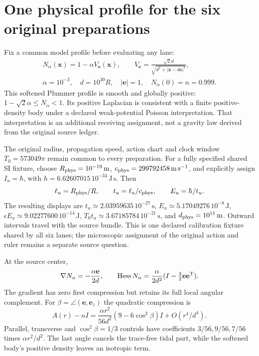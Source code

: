 \section{One physical profile for the six original preparations}
Fix a common model profile before evaluating any lane:
\[
 \begin{gathered}
 N_\alpha(\mathbf x)=1-\alpha V_{\mathbf e}(\mathbf x),\qquad
 V_{\mathbf e}=\frac{\sqrt2d}{\sqrt{d^2+|\mathbf x-d\mathbf e|^2}},\\
 \alpha=10^{-3},\quad d=10^{30}R,\quad |\mathbf e|=1,
 \quad N_\alpha(0)=n=0.999.
 \end{gathered}
\]
This softened Plummer profile is smooth and globally positive:
$1-\sqrt2\alpha\le N_\alpha<1$. Its positive Laplacian is consistent with
a finite positive-density body under a declared weak-potential Poisson
interpretation. That interpretation is an additional receiving assignment,
not a gravity law derived from the original source ledger.

The original radius, propagation speed, action chart and clock window
$T_0=573049\pi$ remain common to every preparation. For a fully specified
shared SI fixture, choose $R_{\rm phys}=10^{-19}\,\mathrm m$,
$c_{\rm phys}=299792458\,\mathrm{m\,s^{-1}}$, and explicitly assign
$I_u=\hbar$, with $h=6.62607015\,10^{-34}\,\mathrm{J\,s}$. Then
\[
 \ell_u=R_{\rm phys}/R,\qquad t_u=\ell_u/c_{\rm phys},
 \qquad E_u=\hbar/t_u.
\]
The resulting displays are $t_u\simeq2.03959635\,10^{-27}\,\mathrm s$,
$E_u\simeq5.17049276\,10^{-8}\,\mathrm J$,
$\epsilon E_u\simeq9.02277600\,10^{-14}\,\mathrm J$,
$T_0t_u\simeq3.67185784\,10^{-21}\,\mathrm s$, and
$d_{\rm phys}=10^{11}\,\mathrm m$. Outward intervals travel with the
source bundle. This is one declared calibration fixture shared by all six
lanes; the microscopic assignment of the original action and ruler remains
a separate source question.

At the source center,
\[
 \nabla N_\alpha=-\frac{\alpha\mathbf e}{2d},\qquad
 \operatorname{Hess}N_\alpha=\frac{\alpha}{2d^2}
       (I-\tfrac32\mathbf e\mathbf e^{\rm T}).
\]
The gradient has zero first compression but retains its full local angular
complement. For $\beta=\angle(\mathbf e,\mathbf e_z)$ the quadratic
compression is
\[
 A(r)-nI=\frac{\alpha r^2}{56d^2}
       (9-6\cos^2\beta)I+O(r^4/d^4).
\]
Parallel, transverse and $\cos^2\beta=1/3$ controls have coefficients
$3/56,9/56,7/56$ times $\alpha r^2/d^2$. The last angle cancels the
trace-free tidal part, while the softened body's positive density leaves
an isotropic term.

